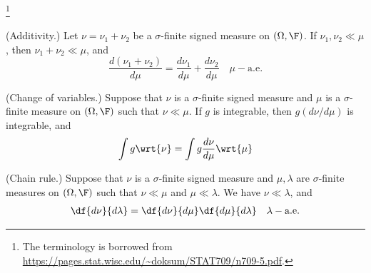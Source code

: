 \documentclass{article} %
\begin{document}

\begin{proposition}{}\footnote{The terminology is borrowed from \url{https://pages.stat.wisc.edu/~doksum/STAT709/n709-5.pdf}.}
\begin{alphabate}
\item \textnormal{(Additivity.)} Let $\nu = \nu_1 + \nu_2$ be a $\sigma$-finite signed measure on $(\Omega,\F)$.  If $\nu_1, \nu_2 \ll \mu$, then $\nu_1 + \nu_2 \ll \mu$, and 
\[ \frac{d(\nu_1+\nu_2)}{d\mu} = \frac{d\nu_1}{d\mu} + \frac{d\nu_2}{d\mu} \quad \mu-\text{a.e.} \] 
\item \textnormal{(Change of variables.)} Suppose that $\nu$ is a $\sigma$-finite signed measure and $\mu$ is a  $\sigma$-finite measure on $(\Omega, \F)$ such that $\nu \ll \mu$. If $g$ is integrable, then $g(d\nu/d\mu)$ is integrable, and 
\[ \int g \wrt{\nu} = \int g \frac{d\nu}{d\mu} \wrt{\mu} \]
\item \textnormal{(Chain rule.)} Suppose that $\nu$ is a $\sigma$-finite signed measure and $\mu, \lambda$ are $\sigma$-finite measures on $(\Omega, \F)$ such that $\nu \ll \mu$ and $\mu \ll \lambda$. We have $\nu \ll \lambda$, and 
\begin{align}
 \df{d\nu}{d\lambda} = \df{d\nu}{d\mu}  \df{d\mu}{d\lambda} \quad \lambda-\text{a.e.} 
 \label{eqn:chain_rule}
\end{align}

\end{alphabate}
\end{proposition}
\end{document}
